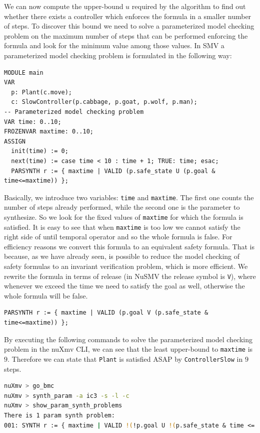 We can now compute the upper-bound $u$ required by the algorithm to find out whether there exists a controller which enforces the formula in a smaller number of steps.
To discover this bound we need to solve a parameterized model checking problem on the maximum number of steps that can be performed enforcing the formula and look for the minimum value among those values.
In SMV a parameterized model checking problem is formulated in the following way:
\begin{lstlisting}[language=smv, caption=Ferryman ASAP: parameterized model checking problem with until operator]
MODULE main
VAR
  p: Plant(c.move);
  c: SlowController(p.cabbage, p.goat, p.wolf, p.man);
-- Parameterized model checking problem
VAR time: 0..10;
FROZENVAR maxtime: 0..10;
ASSIGN
  init(time) := 0;
  next(time) := case time < 10 : time + 1; TRUE: time; esac;
  PARSYNTH r := { maxtime | VALID (p.safe_state U (p.goal & time<=maxtime)) };
\end{lstlisting}

Basically, we introduce two variables: \lstinline{time} and \lstinline{maxtime}.
The first one counts the number of steps already performed, while the second one is the parameter to synthesize. So we look for the fixed values of \lstinline{maxtime} for which the formula is satisfied.
It is easy to see that when \lstinline{maxtime} is too low we cannot satisfy the right side of until temporal operator and so the whole formula is false.
For efficiency reasons we convert this formula to an equivalent safety formula. That is because, as we have already seen, is possible to reduce the model checking of safety formulas to an invariant verification problem, which is more efficient.
We rewrite the formula in terms of release (in NuSMV the release symbol is \lstinline{V}), where whenever we exceed the time we need to satisfy the goal as well, otherwise the whole formula will be false.

\begin{lstlisting}[language=smv, caption=Ferryman ASAP: parameterized model checking problem with release operator]
PARSYNTH r := { maxtime | VALID (p.goal V (p.safe_state & time<=maxtime)) };
\end{lstlisting}

By executing the following commands to solve the parameterized model checking problem in the nuXmv CLI, we can see that the least upper-bound to \lstinline{maxtime} is $9$.
Therefore we can state that \lstinline{Plant} is satisfied ASAP by \lstinline{ControllerSlow} in $9$ steps.
\begin{lstlisting}[language=bash, caption=Ferryman ASAP: commands to execute to solve the parameterized model checking problem]
nuXmv > go_bmc
nuXmv > synth_param -a ic3 -s -l -c
nuXmv > show_param_synth_problems  
There is 1 param synth problem:
001: SYNTH r := { maxtime | VALID !(!p.goal U !(p.safe_state & time <= maxtime)) }, region: (maxtime = 10 | maxtime = 9)
\end{lstlisting}

